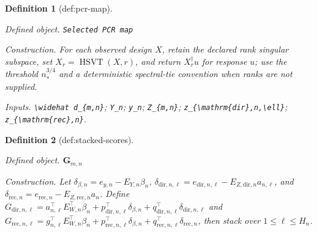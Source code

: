 \documentclass{article}
\newtheorem{definition}{Definition}
\begin{document}
\begin{definition}[def:pcr-map]\label{def:pcr-map}
\par\smallskip\noindent\emph{Defined object.} \texttt{Selected PCR map}
\par\smallskip\noindent\emph{Construction.} For each observed design \(X\), retain the declared rank singular subspace, set \(X_r=\operatorname{HSVT}(X,r)\), and return \(X_r^\dagger u\) for response \(u\); use the threshold \(n_*^{3/4}\) and a deterministic spectral-tie convention when ranks are not supplied.
\par\smallskip\noindent\emph{Inputs.} \texttt{\textbackslash{}\allowbreak{}widehat d\_\allowbreak{}\{m,\allowbreak{}n\}\allowbreak{}}; \texttt{Y\_\allowbreak{}n}; \texttt{y\_\allowbreak{}n}; \texttt{Z\_\allowbreak{}\{m,\allowbreak{}n\}\allowbreak{}}; \texttt{z\_\allowbreak{}\{\textbackslash{}\allowbreak{}mathrm\{dir\}\allowbreak{},\allowbreak{}n,\allowbreak{}\textbackslash{}\allowbreak{}ell\}\allowbreak{}}; \texttt{z\_\allowbreak{}\{\textbackslash{}\allowbreak{}mathrm\{rec\}\allowbreak{},\allowbreak{}n\}\allowbreak{}}.
\end{definition}

\begin{definition}[def:stacked-scores]\label{def:stacked-scores}
\par\smallskip\noindent\emph{Defined object.} \(\boldsymbol G_{m,n}\)
\par\smallskip\noindent\emph{Construction.} Let \(\delta_{\beta,n}=e_{y,n}-E_{Y,n}\beta_n\), \(\delta_{\mathrm{dir},n,\ell}=e_{\mathrm{dir},n,\ell}-E_{Z,\mathrm{dir},n}a_{n,\ell}\), and \(\delta_{\mathrm{rec},n}=e_{\mathrm{rec},n}-E_{Z,\mathrm{rec},n}a_n\). Define \(G_{\mathrm{dir},n,\ell}=a_{n,\ell}^{\top}E_{W,n}^{\top}\beta_n+p_{\mathrm{dir},n,\ell}^{\top}\delta_{\beta,n}+q_{\mathrm{dir},n,\ell}^{\top}\delta_{\mathrm{dir},n,\ell}\) and \(G_{\mathrm{rec},n,\ell}=g_{n,\ell}^{\top}E_{W,n}^{\top}\beta_n+p_{\mathrm{rec},n,\ell}^{\top}\delta_{\beta,n}+q_{\mathrm{rec},n,\ell}^{\top}\delta_{\mathrm{rec},n}\), then stack over \(1\le\ell\le H_n\).
\end{definition}
\end{document}
